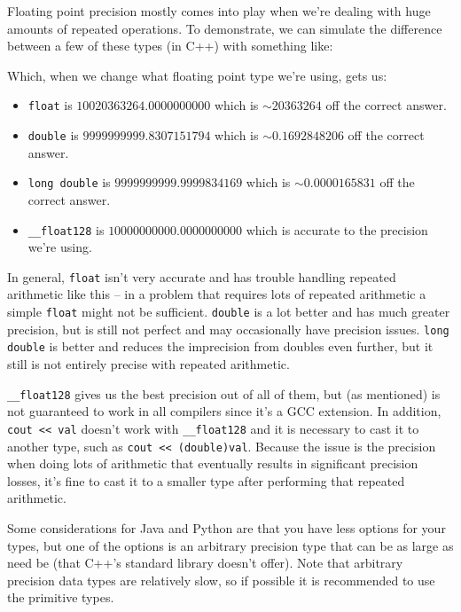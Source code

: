 Floating point precision mostly comes into play when we're dealing with huge amounts of repeated operations. To demonstrate, we can simulate the difference between a few of these types (in C++) with something like:


Which, when we change what floating point type we're using, gets us:

\begin{itemize}
\item \texttt{float} is $10020363264.0000000000$ which is $\sim20363264$ off the correct answer.
\item \texttt{double} is $9999999999.8307151794$ which is $\sim0.1692848206$ off the correct answer.
\item \texttt{long double} is $9999999999.9999834169$ which is $\sim0.0000165831$ off the correct answer.
\item \texttt{__float128} is $10000000000.0000000000$ which is accurate to the precision we're using.
\end{itemize}

In general, \texttt{float} isn't very accurate and has trouble handling repeated arithmetic like this -- in a problem that requires lots of repeated arithmetic a simple \texttt{float} might not be sufficient. \texttt{double} is a lot better and has much greater precision, but is still not perfect and may occasionally have precision issues. \texttt{long double} is better and reduces the imprecision from doubles even further, but it still is not entirely precise with repeated arithmetic.

\texttt{__float128} gives us the best precision out of all of them, but (as mentioned) is not guaranteed to work in all compilers since it's a GCC extension. In addition, \texttt{cout << val} doesn't work with \texttt{__float128} and it is necessary to cast it to another type, such as \texttt{cout << (double)val}. Because the issue is the precision when doing lots of arithmetic that eventually results in significant precision losses, it's fine to cast it to a smaller type after performing that repeated arithmetic.

Some considerations for Java and Python are that you have less options for your types, but one of the options is an arbitrary precision type that can be as large as need be (that C++'s standard library doesn't offer). Note that arbitrary precision data types are relatively slow, so if possible it is recommended to use the primitive types.
